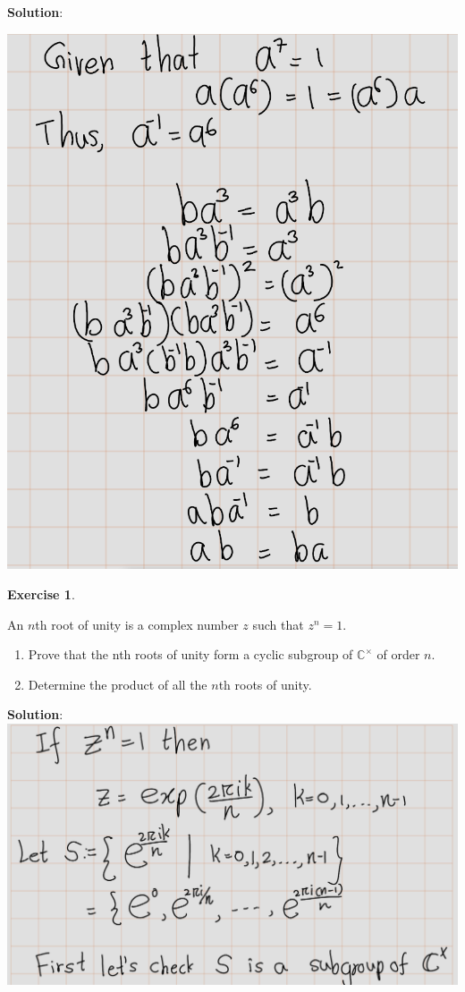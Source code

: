 \documentclass[
]{book}
\providecommand{\tightlist}{%
  \setlength{\itemsep}{0pt}\setlength{\parskip}{0pt}}
\theoremstyle{definition}
\theoremstyle{definition}
\theoremstyle{definition}
\newtheorem{exercise}{Exercise}[chapter]
\theoremstyle{definition}
\theoremstyle{remark}
\begin{document}
\textbf{Solution}:

\includegraphics{figures/ch_2/fig22.png}

\begin{exercise}
\protect\hypertarget{exr:unnamed-chunk-72}{}\label{exr:unnamed-chunk-72}

An \(n\)th root of unity is a complex number \(z\) such that \(z^n = 1\).

\begin{enumerate}
\def\labelenumi{(\alph{enumi})}
\tightlist
\item
  Prove that the nth roots of unity form a cyclic subgroup of \(\mathbb{C}^\times\) of order \(n\).
\item
  Determine the product of all the \(n\)th roots of unity.
\end{enumerate}

\end{exercise}

\textbf{Solution}:
\includegraphics{figures/ch_2/fig23.png}
\end{document}
